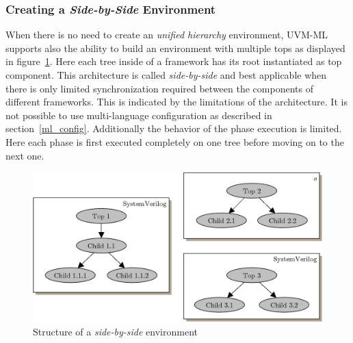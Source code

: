 \subsubsection{Creating a \emph{Side-by-Side} Environment}

When there is no need to create an \emph{unified hierarchy} environment, UVM-ML supports also the ability to build an
environment with multiple tops as displayed in figure~\ref{fig:UVM_ML_side_by_side}. Here each tree inside of a
framework has its root instantiated as top component. This architecture is called \emph{side-by-side} and best
applicable when there is only limited synchronization required between the components of different frameworks. This is
indicated by the limitations of the architecture. It is not possible to use multi-language configuration as described in
section~\ref{ml_config}. Additionally the behavior of the phase execution is limited. Here each phase is first executed
completely on one tree before moving on to the next one. 

\begin{figure}[htb]
 \centering
 \includegraphics[scale=0.3]{abb/UVM_ML_side_by_side}
 \caption{Structure of a \emph{side-by-side} environment}
\label{fig:UVM_ML_side_by_side}
\end{figure}